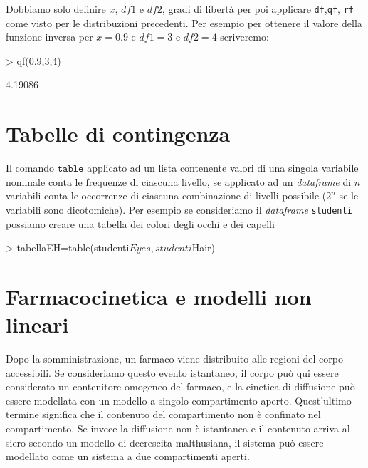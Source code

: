 \documentclass[onecolumn,11pt]{book}
\begin{document}
Dobbiamo solo definire $x$, $df1$ e $df2$, gradi di libert\`a per poi applicare \texttt{df},\texttt{qf}, \texttt{rf} come visto per le distribuzioni precedenti.
Per esempio per ottenere il valore della funzione inversa  per $x=0.9$ e $df1=3$ e $df2=4$ scriveremo:
\begin{Schunk}
\begin{Sinput}
> qf(0.9,3,4)
\end{Sinput}
\begin{Soutput}
[1] 4.19086
\end{Soutput}
\end{Schunk}


\section{Tabelle di contingenza}
Il comando 
$\texttt{table}$ applicato ad un lista contenente valori di una singola variabile nominale conta le frequenze di ciascuna livello, se applicato ad un \emph{dataframe} di $n$  variabili conta le occorrenze di  ciascuna combinazione di livelli possibile ($2^n$ se le variabili sono dicotomiche). Per esempio se consideriamo il \emph{dataframe}  \texttt{studenti}  possiamo creare una tabella dei colori degli occhi e dei capelli
\begin{Schunk}
\begin{Sinput}
> tabellaEH=table(studenti$Eyes,studenti$Hair)
\end{Sinput}
\end{Schunk}
 
 

 
  

\section{Farmacocinetica e modelli non lineari}

Dopo la somministrazione, un farmaco viene distribuito alle regioni del corpo accessibili. 
Se consideriamo questo evento istantaneo, il corpo pu\`o qui essere considerato un contenitore omogeneo del farmaco, e la cinetica di diffusione pu\`o essere modellata con un modello a singolo compartimento aperto. 
Quest'ultimo termine significa che il contenuto del compartimento non \`e confinato nel compartimento.
Se invece la diffusione non \`e istantanea e il contenuto arriva al siero secondo un modello di decrescita malthusiana,  il sistema  pu\`o essere modellato come un sistema a due compartimenti aperti.  
\end{document}
